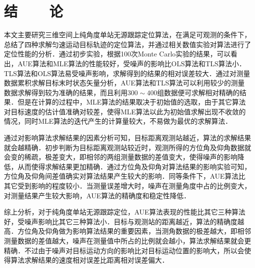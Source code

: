 %
%
%
%
%
%

\chapter*{\vskip 10bp\textmd{结~~~~论} \vskip -6bp}

本文主要研究三维空间上纯角度单站无源跟踪定位算法，在满足可观测的条件下，总结了四种求解匀速运动目标轨迹的定位算法，并通过相关数值实验对算法进行了定位性能的分析．通过初步实验，根据100次Monte Carlo实验的结果，可以看出，AUE算法和MLE算法的性能较好，受噪声的影响比OLS算法和TLS算法小．TLS算法和OLS算法易受噪声影响，求解得到的结果的相对误差较大．通过对测量数据累积求解目标末时状态矢量分析，AUE算法和TLS算法可以利用较少的测量数据求解得到较为准确的结果，而且利用$300 \sim 400$组数据便可求解相对精确的结果．但是在计算的过程中，MLE算法的结果取决于初始值的选取，由于其它算法对目标速度的估计值准确对较差，使得MLE算法以此为初始值求解出现不收敛的情况，同时MLE算法的迭代产生的计算量较大，不易做为最优的求解算法．

通过对影响算法求解结果的因素分析可知，目标距离观测站越近，算法的求解结果就会越精确．初步判断为目标距离观测站较近时，观测所得的方位角及仰角数据就会变的稀疏，极差变大，即相邻的两组测量数据的差值变大，使得噪声的影响降低，从而使得求解结果更加精确．通过方位角及仰角对算法结果的影响实验可知，方位角及仰角间差值确实对算法结果产生较大的影响．同等条件下，AUE算法比其它受到影响的程度较小．当测量误差增大时，噪声在测量角度中占的比例变大，对测量结果产生较大影响，AUE算法的精确度和稳定性降低．

综上分析，对于纯角度单站无源跟踪定位，AUE算法表现的性能比其它三种算法好，受噪声影响比其它三种算法小．目标与观测站的距离越近，算法的精确度越高．方位角及仰角做为影响算法结果的重要因素，当测角数据的极差越大，即相邻测量数据的差值越大，噪声在测量值中所占的比例就会越小，算法求解结果就会更精确．不过由于噪声对目标运动方向的影响比对目标运动位置的影响大，所以会使得算法求解结果的速度相对误差比距离相对误差偏大．

